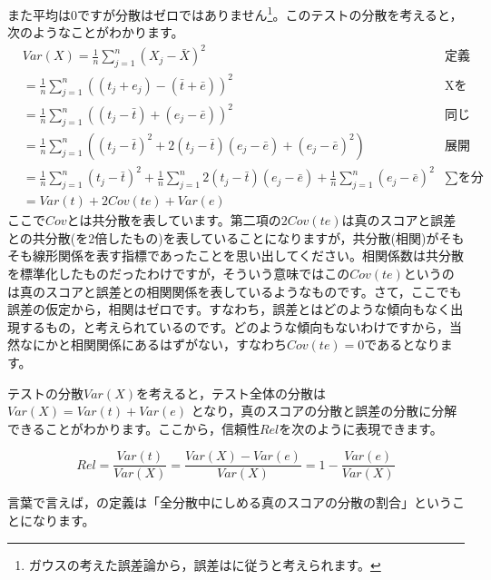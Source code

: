 \documentclass{ltjsbook}
\begin{document}
また平均は$0$ですが分散はゼロではありません\footnote{ガウスの考えた誤差論から，誤差はに従うと考えられます。}。このテストの分散を考えると，次のようなことがわかります。
\begin{align*}
	 & Var(X)  =  \frac{1}{n}\sum_{j=1}^n (X_j - \bar{X})^2                                                                                              & \mbox{定義より}         \\
	 & = \frac{1}{n}\sum_{j=1}^n  ((t_j + e_j) - (\bar{t} + \bar{e}))^2                                                                                  & \mbox{Xをテスト理論のモデルに} \\
	 & = \frac{1}{n}\sum_{j=1}^n (  (t_j - \bar{t}) + (e_j - \bar{e}) )^2                                                                                & \mbox{同じ記号でまとめる}    \\
	 & = \frac{1}{n}\sum_{j=1}^n (  (t_j - \bar{t})^2 + 2(t_j - \bar{t})(e_j - \bar{e}) + (e_j - \bar{e})^2  )                                           & \mbox{展開する}         \\
	 & = \frac{1}{n}\sum_{j=1}^n (t_j - \bar{t})^2 +\frac{1}{n}\sum_{j=1}^n 2(t_j - \bar{t})(e_j - \bar{e})  + \frac{1}{n}\sum_{j=1}^n (e_j - \bar{e})^2 & \mbox{$\sum$を分配}    \\
	 & =  Var(t) + 2Cov(te) + Var(e)
\end{align*}
ここで$Cov$とは共分散を表しています。第二項の$2Cov(te)$は真のスコアと誤差との共分散(を2倍したもの)を表していることになりますが，共分散(相関)がそもそも線形関係を表す指標であったことを思い出してください。相関係数は共分散を標準化したものだったわけですが，そういう意味ではこの$Cov(te)$というのは真のスコアと誤差との相関関係を表しているようなものです。さて，ここでも誤差の仮定から，相関はゼロです。すなわち，誤差とはどのような傾向もなく出現するもの，と考えられているのです。どのような傾向もないわけですから，当然なにかと相関関係にあるはずがない，すなわち$Cov(te)=0$であるとなります。

テストの分散$Var(X)$を考えると，テスト全体の分散は$Var(X)=Var(t)+Var(e)$ となり，真のスコアの分散と誤差の分散に分解できることがわかります。ここから，信頼性$Rel$を次のように表現できます。

\[Rel = \frac{Var(t)}{Var(X)}= \frac{Var(X)-Var(e)}{Var(X)} = 1-\frac{Var(e)}{Var(X)}\]

言葉で言えば，の定義は「全分散中にしめる真のスコアの分散の割合」ということになります。
\end{document}
